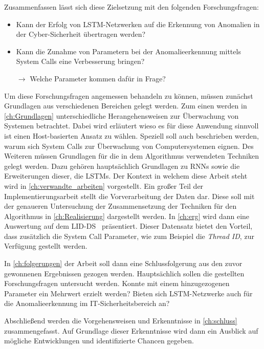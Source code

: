 Zusammenfassen lässt sich diese Zielsetzung mit den folgenden Forschungsfragen:
\begin{itemize}
    \item Kann der Erfolg von \ac{LSTM}-Netzwerken auf die Erkennung von Anomalien in der Cyber-Sicherheit übertragen werden?
    \item Kann die Zunahme von Parametern bei der Anomalieerkennung mittels System Calls eine Verbesserung bringen?

        $\rightarrow$ Welche Parameter kommen dafür in Frage?
\end{itemize}

Um diese Forschungsfragen angemessen behandeln zu können, müssen zunächst Grundlagen aus verschiedenen Bereichen gelegt werden.
Zum einen werden in \autoref{ch:Grundlagen} unterschiedliche Herangehensweisen zur Überwachung von Systemen betrachtet.
Dabei wird erläutert wieso es für diese Anwendung sinnvoll ist einen Host-basierten Ansatz zu wählen.
Speziell soll auch beschrieben werden, warum sich System Calls zur Überwachung von Computersystemen eignen.
Des Weiteren müssen Grundlagen für die in dem Algorithmus verwendeten Techniken gelegt werden.
Dazu gehören hauptsächlich Grundlagen zu \acfp{RNN} sowie die Erweiterungen dieser, die \acp{LSTM}.
Der Kontext in welchem diese Arbeit steht wird in \autoref{ch:verwandte_arbeiten} vorgestellt.
Ein großer Teil der Implementierungsarbeit stellt die Vorverarbeitung der Daten dar.
Diese soll mit der genaueren Untersuchung der Zusammensetzung der Techniken für den Algorithmus in \autoref{ch:Realisierung} dargestellt werden.
In \autoref{ch:erg} wird dann eine Auswertung auf dem \acf{LID-DS}~\cite{LID-DS} präsentiert.
Dieser Datensatz bietet den Vorteil, dass zusätzlich die System Call Parameter, wie zum Beispiel die \textit{Thread ID}, zur Verfügung gestellt werden.

In \autoref{ch:folgerungen} der Arbeit soll dann eine Schlussfolgerung aus den zuvor gewonnenen Ergebnissen gezogen werden. 
Hauptsächlich sollen die gestellten Forschungsfragen untersucht werden.
Konnte mit einem hinzugezogenen Parameter ein Mehrwert erzielt werden?
Bieten sich LSTM-Netzwerke auch für die Anomalieerkennung im IT-Sicherheitsbereich an?

Abschließend werden die Vorgehensweisen und Erkenntnisse in \autoref{ch:schluss} zusammengefasst.
Auf Grundlage dieser Erkenntnisse wird dann ein Ausblick auf mögliche Entwicklungen und identifizierte Chancen gegeben. 

